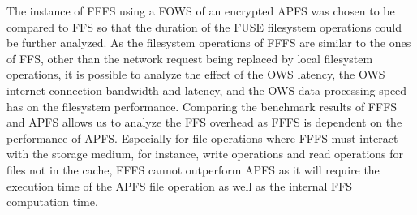 The instance of \gls{FFFS} using a \gls{FOWS} of an encrypted \gls{APFS} was chosen to be compared to \gls{FFS} so that the duration of the \gls{FUSE} filesystem operations could be further analyzed. As the filesystem operations of \gls{FFFS} are similar to the ones of \gls{FFS}, other than the network request being replaced by local filesystem operations, it is possible to analyze the effect of the \gls{OWS} latency, the \gls{OWS} internet connection bandwidth and latency, and the \gls{OWS} data processing speed has on the filesystem performance. Comparing the benchmark results of \gls{FFFS} and \gls{APFS} allows us to analyze the \gls{FFS} overhead as \gls{FFFS} is dependent on the performance of \gls{APFS}. Especially for file operations where \gls{FFFS} must interact with the storage medium, for instance, write operations and read operations for files not in the cache, \gls{FFFS} cannot outperform \gls{APFS} as it will require the execution time of the \gls{APFS} file operation as well as the internal \gls{FFS} computation time.

